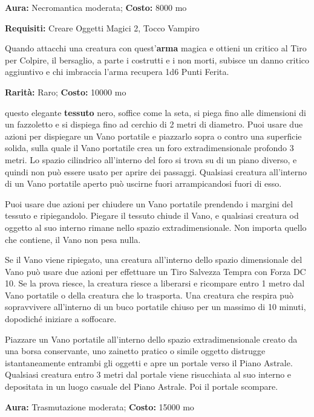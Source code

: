 \begin{multicols}{2}
\textbf{Aura:} Necromantica moderata; \textbf{Costo:} 8000 mo

\textbf{Requisiti:} Creare Oggetti Magici 2, Tocco Vampiro

Quando attacchi una creatura con quest'\textbf{arma} magica e ottieni un critico al Tiro per Colpire, il bersaglio, a parte i costrutti e i non morti, subisce un danno critico aggiuntivo e chi imbraccia l'arma recupera 1d6 Punti Ferita.


\textbf{Rarità:} Raro; \textbf{Costo:} 10000 mo

questo elegante \textbf{tessuto} nero, soffice come la seta, si piega fino alle dimensioni di un fazzoletto e si dispiega fino ad cerchio di 2 metri di diametro. Puoi usare due azioni per dispiegare un Vano portatile e piazzarlo sopra o contro una superficie solida, sulla quale il Vano portatile crea un foro extradimensionale profondo 3 metri. Lo spazio cilindrico all'interno del foro si trova su di un piano diverso, e quindi non può essere usato per aprire dei passaggi. Qualsiasi creatura all'interno di un Vano portatile aperto può uscirne fuori arrampicandosi fuori di esso.

Puoi usare due azioni per chiudere un Vano portatile prendendo i margini del tessuto e ripiegandolo. Piegare il tessuto chiude il Vano, e qualsiasi creatura od oggetto al suo interno rimane nello spazio extradimensionale. Non importa quello che contiene, il Vano non pesa nulla.

Se il Vano viene ripiegato, una creatura all'interno dello spazio dimensionale del Vano può usare due azioni per effettuare un Tiro Salvezza Tempra con Forza DC 10. Se la prova riesce, la creatura riesce a liberarsi e ricompare entro 1 metro dal Vano portatile o della creatura che lo trasporta. Una creatura che respira può sopravvivere all'interno di un buco portatile chiuso per un massimo di 10 minuti, dopodiché iniziare a soffocare.

Piazzare un Vano portatile all'interno dello spazio extradimensionale creato da una borsa conservante, uno zainetto pratico o simile oggetto distrugge istantaneamente entrambi gli oggetti e apre un portale verso il Piano Astrale. Qualsiasi creatura entro 3 metri dal portale viene risucchiata al suo interno e depositata in un luogo casuale del Piano Astrale. Poi il portale scompare.


\textbf{Aura:} Trasmutazione moderata; \textbf{Costo:} 15000 mo


\end{multicols}
